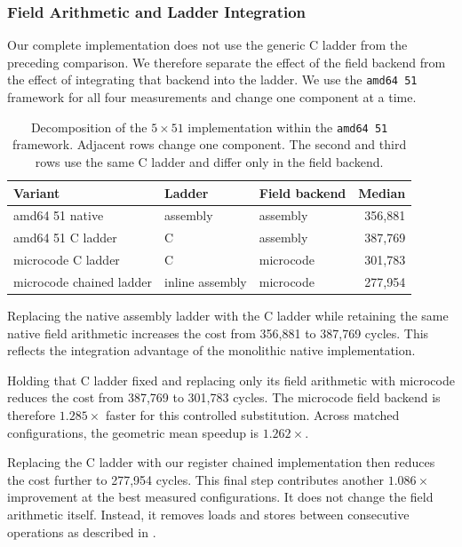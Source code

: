 \documentclass[journal=tches,submission]{iacrtrans}
\begin{document}
\subsubsection{Field Arithmetic and Ladder Integration}
\label{sec}

Our complete implementation does not use the generic C ladder from the preceding comparison.
We therefore separate the effect of the field backend from the effect of integrating that backend into the ladder.
We use the \texttt{amd64 51} framework for all four measurements and change one component at a time.

\begin{table}[!ht]
\centering
\caption{Decomposition of the $5\times51$ implementation within the \texttt{amd64 51} framework.
Adjacent rows change one component.
The second and third rows use the same C ladder and differ only in the field backend.}
\label{tab}
\footnotesize
\setlength{\tabcolsep}{4pt}
\begin{tabular}{@{}lllr@{}}
\toprule
Variant & Ladder & Field backend & Median \\
\midrule
amd64 51 native &
assembly &
assembly &
356,881 \\
amd64 51 C ladder &
C &
assembly &
387,769 \\
microcode C ladder &
C &
microcode &
301,783 \\
microcode chained ladder &
inline assembly &
microcode &
277,954 \\
\bottomrule
\end{tabular}
\end{table}

Replacing the native assembly ladder with the C ladder while retaining the same native field arithmetic increases the cost from 356,881 to 387,769 cycles.
This reflects the integration advantage of the monolithic native implementation.

Holding that C ladder fixed and replacing only its field arithmetic with microcode reduces the cost from 387,769 to 301,783 cycles.
The microcode field backend is therefore $1.285\times$ faster for this controlled substitution.
Across matched configurations, the geometric mean speedup is $1.262\times$.

Replacing the C ladder with our register chained implementation then reduces the cost further to 277,954 cycles.
This final step contributes another $1.086\times$ improvement at the best measured configurations.
It does not change the field arithmetic itself.
Instead, it removes loads and stores between consecutive operations as described in .
\end{document}
